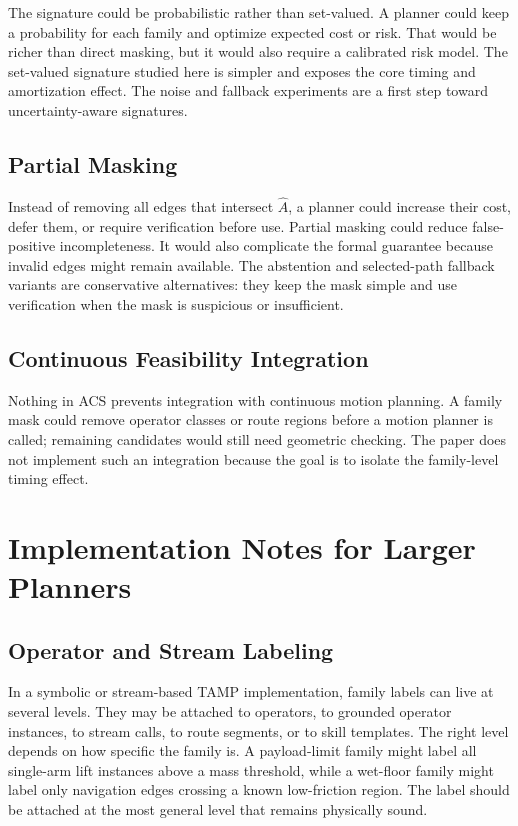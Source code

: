 \documentclass{article}
\newcommand{\ACS}{\textsc{ACS}}
\newcommand{\Ahat}{\hat{A}}
\begin{document}
The signature could be probabilistic rather than set-valued. A planner could keep a probability for each family and optimize expected cost or risk. That would be richer than direct masking, but it would also require a calibrated risk model. The set-valued signature studied here is simpler and exposes the core timing and amortization effect. The noise and fallback experiments are a first step toward uncertainty-aware signatures.

\subsection{Partial Masking}

Instead of removing all edges that intersect $\Ahat$, a planner could increase their cost, defer them, or require verification before use. Partial masking could reduce false-positive incompleteness. It would also complicate the formal guarantee because invalid edges might remain available. The abstention and selected-path fallback variants are conservative alternatives: they keep the mask simple and use verification when the mask is suspicious or insufficient.

\subsection{Continuous Feasibility Integration}

Nothing in \ACS{} prevents integration with continuous motion planning. A family mask could remove operator classes or route regions before a motion planner is called; remaining candidates would still need geometric checking. The paper does not implement such an integration because the goal is to isolate the family-level timing effect.

\section{Implementation Notes for Larger Planners}

\subsection{Operator and Stream Labeling}

In a symbolic or stream-based TAMP implementation, family labels can live at several levels. They may be attached to operators, to grounded operator instances, to stream calls, to route segments, or to skill templates. The right level depends on how specific the family is. A payload-limit family might label all single-arm lift instances above a mass threshold, while a wet-floor family might label only navigation edges crossing a known low-friction region. The label should be attached at the most general level that remains physically sound.
\end{document}
